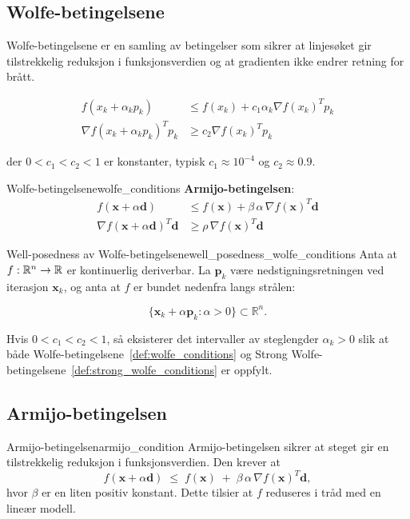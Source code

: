 \subsection{Wolfe-betingelsene}
Wolfe-betingelsene er en samling av betingelser som sikrer at linjesøket gir tilstrekkelig reduksjon i funksjonsverdien og at gradienten ikke endrer retning for brått.


\begin{align}
	f(x_k + \alpha_k p_k)              & \leq f(x_k) + c_1 \alpha_k \nabla f(x_k)^T p_k \tag{Armijo betingelse} \\
	\nabla f(x_k + \alpha_k p_k)^T p_k & \geq c_2 \nabla f(x_k)^T p_k \tag{Krumningsbetingelse}
\end{align}

der \(0 < c_1 < c_2 < 1\) er konstanter, typisk \(c_1 \approx 10^{-4}\) og \(c_2 \approx 0.9\).

\begin{definition}{Wolfe-betingelsene}{wolfe_conditions}
	\textbf{Armijo-betingelsen}:
	\begin{align*}
		f(\symbf{x} + \alpha \symbf{d})                    & \le f(\symbf{x}) + \beta\,\alpha\,\nabla f(\symbf{x})^T \symbf{d} \tag{Armijo} \\
		\nabla f(\symbf{x} + \alpha \symbf{d})^T \symbf{d} & \ge \rho \,\nabla f(\symbf{x})^T \symbf{d} \tag{Krumningsbetingelse}
	\end{align*}
\end{definition}

\begin{lemma}{Well-posedness av Wolfe-betingelsene}{well_posedness_wolfe_conditions}
	Anta at \(f:\mathbb{R}^n \to \mathbb{R} \) er kontinuerlig deriverbar. La \(\mathbf{p}_k\) være nedstigningsretningen ved iterasjon \(\mathbf{x}_k\), og anta at \(f\) er bundet nedenfra langs strålen:

	\[
		\{\mathbf{x}_k + \alpha \mathbf{p}_k : \alpha > 0\} \subset \mathbb{R}^n.
	\]

	\medskip

	Hvis \(0 < c_1 < c_2 < 1\), så eksisterer det intervaller av steglengder \(\alpha_k > 0\) slik at både Wolfe-betingelsene~\ref{def:wolfe_conditions} og Strong Wolfe-betingelsene~\ref{def:strong_wolfe_conditions} er oppfylt.

\end{lemma}

\subsection{Armijo-betingelsen}
\begin{definition}{Armijo-betingelsen}{armijo_condition}
	Armijo-betingelsen sikrer at steget gir en tilstrekkelig reduksjon i funksjonsverdien. Den krever at
	\[
		f(\symbf{x} + \alpha \symbf{d})
		\;\le\;
		f(\symbf{x})
		\;+\;
		\beta\,\alpha\,\nabla f(\symbf{x})^T \symbf{d},
	\]
	hvor \(\beta\) er en liten positiv konstant. Dette tilsier at \(f\) reduseres i tråd med en lineær modell.
\end{definition}

